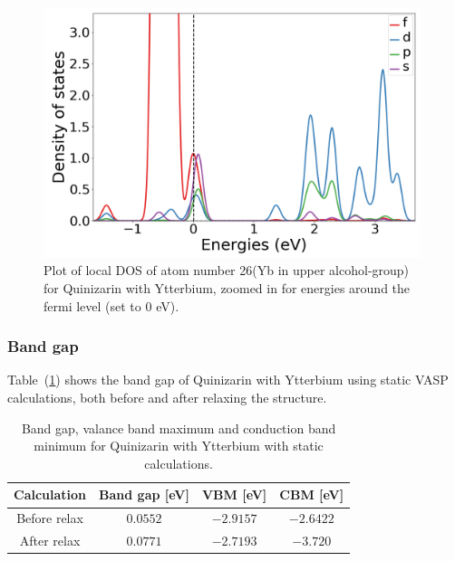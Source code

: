 \documentclass{article}
\begin{document}
      \begin{figure}[H]
          \centering
          \includegraphics[width = 11cm]{../fig/Yb_LDOS26_3.png}
          \caption{Plot of local DOS of atom number 26(Yb in upper alcohol-group) for Quinizarin with Ytterbium, zoomed in for energies around the fermi level (set to 0 eV). }
          \label{fig:Yb_LDOS26_3}
      \end{figure}

      \vspace{1cm}

    \subsubsection{Band gap}

      Table~(\ref{tab:bandgapYb}) shows the band gap of Quinizarin with Ytterbium using static VASP calculations, both before and after relaxing the structure. \\

      \begin{table}[H]
        \centering
        \caption{Band gap, valance band maximum and conduction band minimum for Quinizarin with Ytterbium with static calculations. }
        \vspace{0mm}
        \label{tab:bandgapYb}
        \begin{tabular}{|c|c|c|c|}
            \hline
            Calculation & Band gap [eV] & VBM [eV] & CBM [eV]  \\
            \hline \hline
            Before relax & $0.0552$ & $-2.9157$ & $-2.6422$ \\
            After relax & $0.0771$ & $-2.7193$ & $-3.720$ \\
            \hline
        \end{tabular} \\
        \hspace{0pt}\\
      \end{table}
\end{document}

